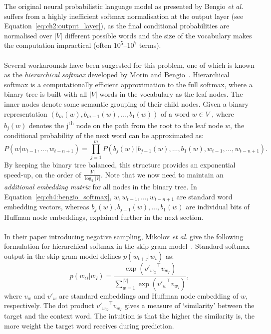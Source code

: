 \documentclass[a4paper,12pt,twoside,openright]{report}
\newcommand{\ti}{\textit}
\newcommand{\nl}{\\ \\}
\begin{document}
The original neural probabilistic language model as presented by Bengio \ti{et al.} suffers from a highly inefficient softmax normalisation at the output layer (see Equation~\ref{eq:ch2:output_layer}), as the final conditional probabilities are normalised over $|V|$ different possible words and the size of the vocabulary makes the computation impractical (often $10^5$--$10^7$ terms).
\nl
Several workarounds have been suggested for this problem, one of which is known as the \ti{hierarchical softmax} developed by Morin and Bengio~\cite{morin05}. Hierarchical softmax is a computationally efficient approximation to the full softmax, where a binary tree is built with all $|V|$ words in the vocabulary as the leaf nodes. The inner nodes denote some semantic grouping of their child nodes. Given a binary representation $(b_m(w), b_{m-1}(w), \dots, b_1(w))$ of a word $w \in V$ , where $b_j(w)$ denotes the j\textsuperscript{th} node on the path from the root to the leaf node $w$, the conditional probability of the next word can be approximated as:
\begin{equation}
P(w|w_{t-1},\dots,w_{t-n+1}) = \prod_{j=1}^{m}{P(b_j(w)|b_{j-1}(w),\dots,b_1(w),w_{t-1},\dots,w_{t-n+1})}.
\label{eq:ch4:bengio_softmax}
\end{equation}
By keeping the binary tree balanced, this structure provides an exponential speed-up, on the order of $\frac{|V|}{\log_2{|V|}}.$ Note that we now need to maintain an \ti{additional embedding matrix} for all nodes in the binary tree. In Equation~\ref{eq:ch4:bengio_softmax}, $w,w_{t-1},\dots,w_{t-n+1}$ are standard word embedding vectors, whereas $b_j(w),b_{j-1}(w),\dots,b_1(w)$ are individual bits of Huffman node embeddings, explained further in the next section.
\nl
In their paper introducing negative sampling, Mikolov \ti{et al}. give the following formulation for hierarchical softmax in the skip-gram model~\cite{mikolov13b}. Standard softmax output in the skip-gram model defines $p(w_{t+j}|w_t)$ as:
\begin{equation}
p(w_O|w_I) = \frac{\exp({v'_{w_O}}^{\intercal}v_{w_I})}{\sum_{w=1}^{|V|}\exp({v'_{w}}^{\intercal}v_{w_I})},
\label{eq:ch4:skip_softmax}
\end{equation}
where $v_w$ and $v'_w$ are standard embeddings and Huffman node embedding of $w$, respectively. The dot product ${v'_{w_O}}^{\intercal}v_{w_I}$ gives a measure of `similarity' between the target and the context word. The intuition is that the higher the similarity is, the more weight the target word receives during prediction. 
\end{document}

